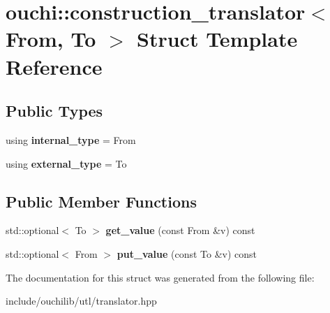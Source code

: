\hypertarget{structouchi_1_1construction__translator}{}\section{ouchi\+::construction\+\_\+translator$<$ From, To $>$ Struct Template Reference}
\label{structouchi_1_1construction__translator}
\subsection*{Public Types}
\begin{DoxyCompactItemize}
\item 
\mbox{\label{structouchi_1_1construction__translator_ae46797fe289adc2cd50125a656d5a579}} 
using {\bfseries internal\+\_\+type} = From
\item 
\mbox{\label{structouchi_1_1construction__translator_ab3d5ce34b08a0519d485bb1b81986620}} 
using {\bfseries external\+\_\+type} = To
\end{DoxyCompactItemize}
\subsection*{Public Member Functions}
\begin{DoxyCompactItemize}
\item 
\mbox{\label{structouchi_1_1construction__translator_ade0c57379550e3b8c6940f9b0ddac79e}} 
std\+::optional$<$ To $>$ {\bfseries get\+\_\+value} (const From \&v) const
\item 
\mbox{\label{structouchi_1_1construction__translator_a78979a44a120340b8a16515b6c12db19}} 
std\+::optional$<$ From $>$ {\bfseries put\+\_\+value} (const To \&v) const
\end{DoxyCompactItemize}


The documentation for this struct was generated from the following file\+:\begin{DoxyCompactItemize}
\item 
include/ouchilib/utl/translator.\+hpp\end{DoxyCompactItemize}
